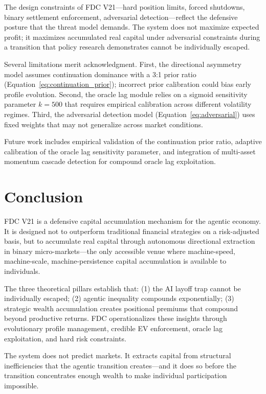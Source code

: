 \documentclass[11pt,a4paper]{article}
\begin{document}
The design constraints of FDC V21---hard position limits, forced shutdowns, binary settlement enforcement, adversarial detection---reflect the defensive posture that the threat model demands. The system does not maximize expected profit; it maximizes accumulated real capital under adversarial constraints during a transition that policy research demonstrates cannot be individually escaped.

Several limitations merit acknowledgment. First, the directional asymmetry model assumes continuation dominance with a 3:1 prior ratio (Equation~\ref{eq:continuation_prior}); incorrect prior calibration could bias early profile evolution. Second, the oracle lag module relies on a sigmoid sensitivity parameter $k = 500$ that requires empirical calibration across different volatility regimes. Third, the adversarial detection model (Equation~\ref{eq:adversarial}) uses fixed weights that may not generalize across market conditions.

Future work includes empirical validation of the continuation prior ratio, adaptive calibration of the oracle lag sensitivity parameter, and integration of multi-asset momentum cascade detection for compound oracle lag exploitation.

\section{Conclusion}

FDC V21 is a defensive capital accumulation mechanism for the agentic economy. It is designed not to outperform traditional financial strategies on a risk-adjusted basis, but to accumulate real capital through autonomous directional extraction in binary micro-markets---the only accessible venue where machine-speed, machine-scale, machine-persistence capital accumulation is available to individuals.

The three theoretical pillars establish that: (1) the AI layoff trap cannot be individually escaped; (2) agentic inequality compounds exponentially; (3) strategic wealth accumulation creates positional premiums that compound beyond productive returns. FDC operationalizes these insights through evolutionary profile management, credible EV enforcement, oracle lag exploitation, and hard risk constraints.

The system does not predict markets. It extracts capital from structural inefficiencies that the agentic transition creates---and it does so before the transition concentrates enough wealth to make individual participation impossible.
\end{document}
